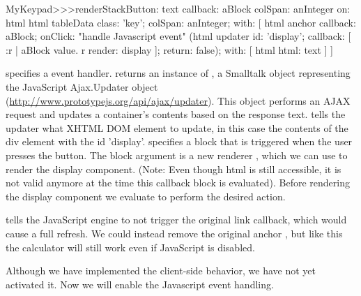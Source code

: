 \documentclass[a4paper,10pt,twoside]{book}
\begin{document}

\begin{code}{}
MyKeypad>>>renderStackButton: text callback: aBlock colSpan: anInteger on: html 
	html tableData
		class: 'key';
		colSpan: anInteger;
		with: [
			html anchor
				callback: aBlock;
				onClick:				"handle Javascript event"
					(html updater
						id: 'display';
						callback: [ :r |
							aBlock value.
							r render: display ];
						return: false);
				with: [ html html: text ] ]
\end{code}

 specifies a  event handler.
 returns an instance of , a Smalltalk object representing the JavaScript Ajax.Updater object (\url{http://www.prototypejs.org/api/ajax/updater}).
This object performs an AJAX request and updates a container's contents based on the response text.
 tells the updater what XHTML DOM element to update, in this case the contents of the div element with the id 'display'.
 specifies a block that is triggered when the user presses the button.
The block argument is a new renderer , which we can use to render the display component.
(Note: Even though html is still accessible, it is not valid anymore at the time this callback block is evaluated).
Before rendering the display component we evaluate  to perform the desired action.

 tells the JavaScript engine to not trigger the original link callback, which would cause a full refresh.
We could instead remove the original anchor , but like this the calculator will still work even if JavaScript is disabled.


Although we have implemented the client-side behavior, we have not yet activated it.
Now we will enable the Javascript event handling.
\end{document}
